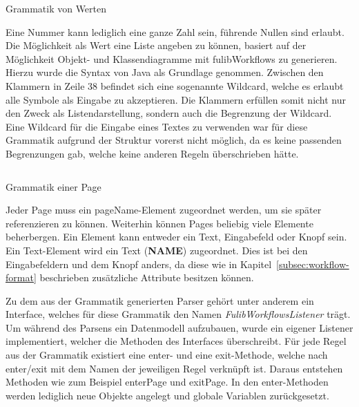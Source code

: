\begin{listing}[!ht]
    \inputminted[firstnumber=36]{antlr-java}{listings/3.1.3/Values.g4}
    \caption{Grammatik von Werten}
    \label{listing:values}
\end{listing}

Eine Nummer kann lediglich eine ganze Zahl sein, führende Nullen sind erlaubt.
Die Möglichkeit als Wert eine Liste angeben zu können, basiert auf der Möglichkeit Objekt- und Klassendiagramme mit fulibWorkflows zu generieren.
Hierzu wurde die Syntax von Java als Grundlage genommen.
Zwischen den Klammern in Zeile 38 befindet sich eine sogenannte Wildcard, welche es erlaubt alle Symbole als Eingabe zu akzeptieren.
Die Klammern erfüllen somit nicht nur den Zweck als Listendarstellung, sondern auch die Begrenzung der Wildcard.
Eine Wildcard für die Eingabe eines Textes zu verwenden war für diese Grammatik aufgrund der Struktur vorerst nicht möglich, da es keine passenden Begrenzungen gab,
welche keine anderen Regeln überschrieben hätte.

\begin{listing}[!ht]
    \inputminted[firstnumber=23]{antlr-java}{listings/3.1.3/Page.g4}
    \caption{Grammatik einer Page}
    \label{listing:page}
\end{listing}

Jeder Page muss ein pageName-Element zugeordnet werden, um sie später referenzieren zu können.
Weiterhin können Pages beliebig viele Elemente beherbergen.
Ein Element kann entweder ein Text, Eingabefeld oder Knopf sein.
Ein Text-Element wird ein Text (\textbf{NAME}) zugeordnet.
Dies ist bei den Eingabefeldern und dem Knopf anders, da diese wie in Kapitel~\ref{subsec:workflow-format} beschrieben zusätzliche
Attribute besitzen können.

Zu dem aus der Grammatik generierten Parser gehört unter anderem ein Interface, welches für diese Grammatik den Namen \textit{FulibWorkflowsListener} trägt.
Um während des Parsens ein Datenmodell aufzubauen, wurde ein eigener Listener implementiert, welcher die Methoden des Interfaces überschreibt.
Für jede Regel aus der Grammatik existiert eine enter- und eine exit-Methode, welche nach enter/exit mit dem Namen der jeweiligen Regel verknüpft ist.
Daraus entstehen Methoden wie zum Beispiel enterPage und exitPage.
In den enter-Methoden werden lediglich neue Objekte angelegt und globale Variablen zurückgesetzt.

